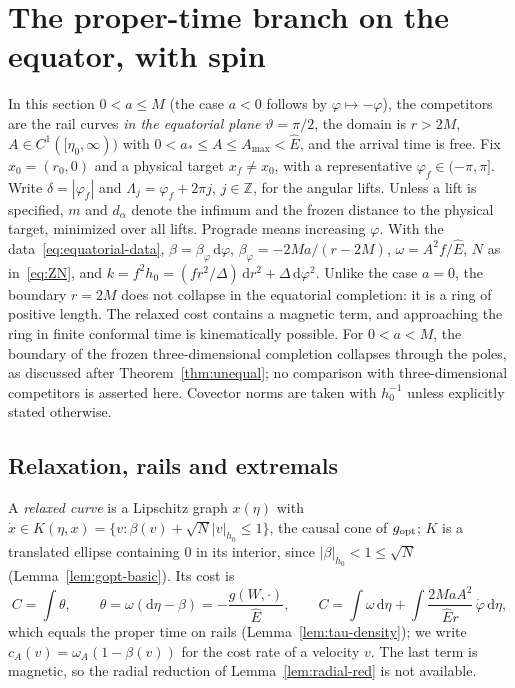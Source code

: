 \documentclass[aip,jmp,amsmath,amssymb,reprint]{revtex4-2}
\newcommand{\Ehat}{\hat E}
\newcommand{\dd}{\mathrm{d}}
\newcommand{\gopt}{g_{\rm opt}}
\theoremstyle{plain}
\theoremstyle{definition}
\begin{document}
\section{The proper-time branch on the equator, with spin}
\label{sec:tau-eq}
In this section $0<a\le M$ (the case $a<0$ follows by $\varphi\mapsto-\varphi$), the
competitors are the rail curves \emph{in the equatorial plane} $\vartheta=\pi/2$, the domain is
$r>2M$, $A\in C^1([\eta_0,\infty))$ with $0<a_*\le A\le A_{\max}<\Ehat$, and the arrival time is
free. Fix $x_0=(r_0,0)$ and a physical target $x_f\ne x_0$, with a representative
$\varphi_f\in(-\pi,\pi]$. Write $\delta=|\varphi_f|$ and $\Lambda_j=\varphi_f+2\pi j$, $j\in\mathbb Z$, for the
angular lifts. Unless a lift is specified, $m$ and $d_\alpha$ denote the infimum and the frozen
distance to the physical target, minimized over all lifts. Prograde means increasing $\varphi$. With the data~\eqref{eq:equatorial-data},
$\beta=\beta_\varphi\,\dd\varphi$, $\beta_\varphi=-2Ma/(r-2M)$, $\omega=A^2f/\Ehat$, $N$ as
in~\eqref{eq:ZN}, and $k=f^2h_0=(fr^2/\Delta)\,\dd r^2+\Delta\,\dd\varphi^2$. Unlike the case $a=0$, the
boundary $r=2M$ does not collapse in the equatorial completion: it is a ring of positive length.
The relaxed cost contains a magnetic term, and approaching the ring in finite conformal time is
kinematically possible. For $0<a<M$, the boundary of the frozen three-dimensional completion
collapses through the poles, as discussed after Theorem~\ref{thm:unequal}; no comparison with
three-dimensional competitors is asserted here. Covector norms are taken with $h_0^{-1}$ unless
explicitly stated otherwise.

\subsection{Relaxation, rails and extremals}
A \emph{relaxed curve} is a Lipschitz graph $x(\eta)$ with
$\dot x\in K(\eta,x)=\{v:\beta(v)+\sqrt N|v|_{h_0}\le1\}$, the causal cone of $\gopt$; $K$ is a
translated ellipse containing $0$ in its interior, since $|\beta|_{h_0}<1\le\sqrt N$
(Lemma~\ref{lem:gopt-basic}). Its cost is
\begin{equation}
  C=\int\theta,\qquad \theta=\omega(\dd\eta-\beta)=-\frac{g(W,\cdot)}{\Ehat},
  \qquad
  C=\int\omega\,\dd\eta+\int\frac{2MaA^2}{\Ehat r}\,\dot\varphi\,\dd\eta ,
  \label{eq:tau-eq-cost}
\end{equation}
which equals the proper time on rails (Lemma~\ref{lem:tau-density}); we write
$c_A(v)=\omega_A(1-\beta(v))$ for the cost rate of a velocity $v$. The last term is magnetic,
so the radial reduction of Lemma~\ref{lem:radial-red} is not available.
\end{document}
